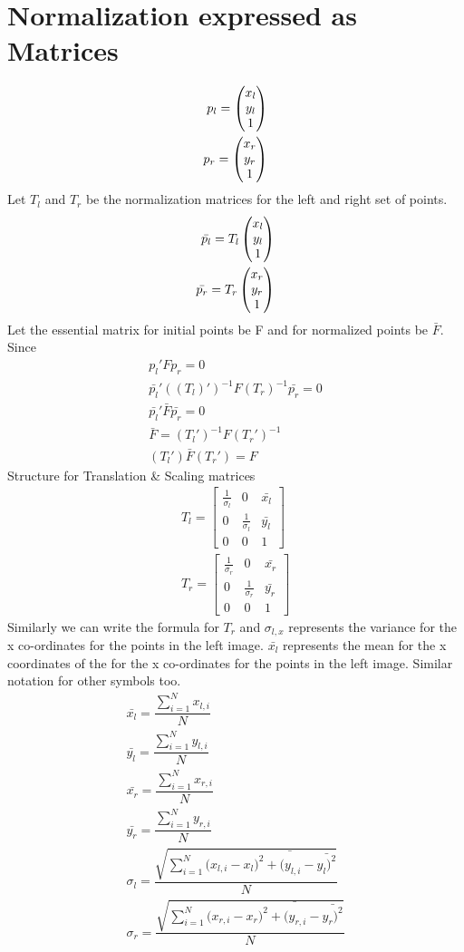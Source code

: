 \documentclass[11pt]{article}
\begin{document}
\section{Normalization expressed as Matrices}
\begin{eqnarray}
p_{l} = \colvec[x_{l}]{y_{l}}{1}\\
p_{r} = \colvec[x_{r}]{y_{r}}{1} 
\end{eqnarray}
Let $T_{l}$ and $T_{r}$ be the normalization matrices for the left and right set of points.
\begin{eqnarray}
\bar{p_{l}} = T_{l}\colvec[x_{l}]{y_{l}}{1}\\
\bar{p_{r}} = T_{r}\colvec[x_{r}]{y_{r}}{1} 
\end{eqnarray}
Let the essential matrix for initial points be F and for normalized points be $\bar{F}$. Since
\begin{eqnarray}
p_{l}'Fp_{r} = 0\\
\bar{p_{l}}'((T_{l})')^{-1}F(T_{r})^{-1}\bar{p_{r}} = 0\\
\bar{p_{l}}'\bar{F}\bar{p_{r}} = 0\\
\bar{F} = (T_{l}')^{-1}F(T_{r}')^{-1}\\
(T_{l}')\bar{F}(T_{r}') = F
\end{eqnarray}
Structure for Translation \& Scaling matrices
\begin{eqnarray}
T_{l} = \begin{bmatrix}
       \frac{1}{\sigma_{l}} & 0 & \bar{x_{l}}           \\[0.3em]
       0 & \frac{1}{\sigma_{l}}          & \bar{y_{l}} \\[0.3em]
       0           & 0 & 1
     \end{bmatrix}\\
T_{r} = \begin{bmatrix}
       \frac{1}{\sigma_{r}} & 0 & \bar{x_{r}}           \\[0.3em]
       0 & \frac{1}{\sigma_{r}}          & \bar{y_{r}} \\[0.3em]
       0           & 0 & 1
     \end{bmatrix}
\end{eqnarray}
Similarly we can write the formula for $T_{r}$ and $\sigma_{l,x}$ represents the variance for the x co-ordinates for the points in the left image. $\bar{x_{l}}$ represents the mean for the x coordinates of the for the x co-ordinates for the points in the left image. Similar notation for other symbols too.
\begin{eqnarray}
\bar{x_{l}} = \dfrac{\sum\limits_{i=1}^{N} x_{l,i}}{N}\\
\bar{y_{l}} = \dfrac{\sum\limits_{i=1}^{N} y_{l,i}}{N}\\
\bar{x_{r}} = \dfrac{\sum\limits_{i=1}^{N} x_{r,i}}{N}\\
\bar{y_{r}} = \dfrac{\sum\limits_{i=1}^{N} y_{r,i}}{N}\\
\sigma_{l} = \dfrac{\sqrt{\sum\limits_{i=1}^{N} (x_{l,i}-\bar{x_{l})^{2}+(y_{l,i}-\bar{y_{l})^{2}}}}}{N}\\
\sigma_{r} = \dfrac{\sqrt{\sum\limits_{i=1}^{N} (x_{r,i}-\bar{x_{r})^{2}+(y_{r,i}-\bar{y_{r})^{2}}}}}{N}
\end{eqnarray}
\end{document}
